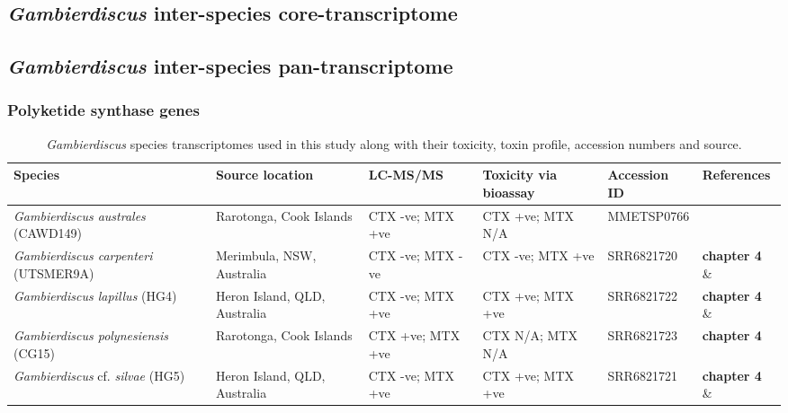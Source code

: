 \documentclass[12pt]{article}
\begin{document}
\subsection*{\emph{Gambierdiscus} inter-species core-transcriptome}

\subsection*{\emph{Gambierdiscus} inter-species pan-transcriptome}


\subsubsection*{Polyketide synthase genes}
\begin{table}
\caption{\emph{Gambierdiscus} species transcriptomes used in this study along with their toxicity, toxin profile, accession numbers and source.}
\label{tbl:SeqTable}
\begin{tabular}{ | p{3cm} | p{2cm} | p{2.5cm} | p{2.5cm} | p{2cm} | p{2cm}|}
\hline
\textbf{Species} & \textbf{Source location}&\textbf{LC-MS/MS} & \textbf{Toxicity via bioassay} & \textbf{Accession ID} & \textbf{References} \\
\hline
\textit{Gambierdiscus australes} (CAWD149)&Rarotonga, Cook Islands& CTX -ve; MTX +ve&CTX +ve; MTX N/A&MMETSP0766&\cite{keeling2014marine,rhodes2010toxic,rhodes2014production,munday2017ciguatoxins}\\
\hline
\textit{Gambierdiscus carpenteri} (UTSMER9A)&Merimbula, NSW, Australia&CTX -ve; MTX -ve&CTX -ve; MTX +ve&SRR6821720
&\textbf{chapter 4} \& \cite{larsson2018toxicology}\\
\hline
\textit{Gambierdiscus lapillus} (HG4)&Heron Island, QLD, Australia&CTX -ve; MTX +ve&CTX +ve; MTX +ve&SRR6821722
&\textbf{chapter 4} \& \cite{larsson2018toxicology,kretzschmar2017characterization}\\
\hline
\textit{Gambierdiscus polynesiensis} (CG15)&Rarotonga, Cook Islands&CTX +ve; MTX +ve&CTX N/A; MTX N/A&SRR6821723
&\textbf{chapter 4} \\
\hline
\textit{Gambierdiscus} cf. \textit{silvae} (HG5)&Heron Island, QLD, Australia&CTX -ve; MTX +ve&CTX +ve; MTX +ve&SRR6821721
&\textbf{chapter 4} \& \cite{larsson2018toxicology,kretzschmar2017characterization}\\
\hline
\end{tabular}
\end{table}
\FloatBarrier
\newpage
\end{document}
